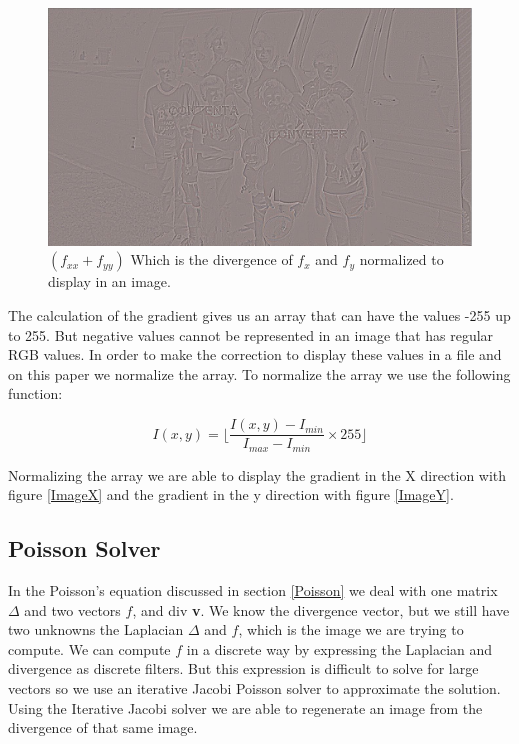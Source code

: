 \documentclass[10pt,twopage]{acmsiggraph}
\begin{document}
\begin{figure}
\centering
\includegraphics[width=.44\textwidth]{fig/divG.jpg}
\caption{\ensuremath{(f_{xx} + f_{yy})} Which is the divergence of \ensuremath{f_{x}} and \ensuremath{f_{y}} normalized to display in an image.}
\label{div}
\end{figure}

The calculation of the gradient gives us an array that can have the values -255 up to 255. But negative values cannot be represented in an image that has regular RGB values. In order to make the correction to display these values in a file and on this paper we normalize the array. To normalize the array we use the following function:

\begin{equation}
\label{normalize}
\ensuremath{I(x,y) = \lfloor\frac{I(x,y) - I_{min}}{I_{max} - I_{min}} \times 255 \rfloor}
\end{equation}


Normalizing the array we are able to display the gradient in the X direction with figure \ref{ImageX} and the gradient in the y direction with figure \ref{ImageY}.

\subsection{Poisson Solver}

In the Poisson's equation discussed in section \ref{Poisson} we deal with one matrix \ensuremath{\Delta} and two vectors $f$, and div {\bf v}. We know the divergence vector, but we still have two unknowns the Laplacian \ensuremath{\Delta} and $f$, which is the image we are trying to compute. We can compute $f$ in a discrete way by expressing the Laplacian and divergence as discrete filters.  But this expression is difficult to solve for large vectors so we use an iterative Jacobi Poisson solver to approximate the solution. Using the Iterative Jacobi solver we are able to regenerate an image from the divergence of that same image. 
\end{document}
